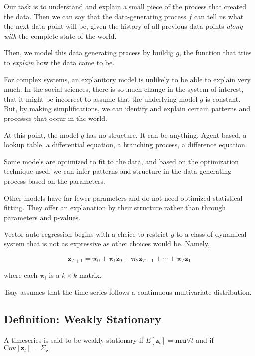 \documentclass{article}
\begin{document}
        Our task is to understand and explain a small piece of
        the process that created the data. Then we can say that
        the data-generating process $f$ can tell us what the next
        data point will be, given the history of all previous data
        points \textit{along with} the complete state of 
        the world.
    
        Then, we model this data generating process by buildig $g$,
        the function that tries to \textit{explain} how the data
        came to be.
    
        For complex systems, an explanitory model is unlikely to
        be able to explain very much. In the social sciences,
        there is so much change in the system of interest, that it might
        be incorrect to assume that the underlying model $g$ is constant.
        But, by making simplifications, we can identify and explain
        certain patterns and processes that occur in the world.
    
        At this point, the model $g$ has no structure. It can be anything.
        Agent based, a lookup table, a differential equation, a
        branching process, a difference equation.
    
        Some models are optimized to fit to the data, and based on 
        the optimization technique used, we can infer patterns and 
        structure in the data generating process based on the parameters.
        
        Other models have far fewer parameters and do not need optimized
        statistical fitting. They offer an explanation by their structure
        rather than through parameters and p-values.
    
        Vector auto regression begins with a choice to restrict $g$
        to a class of dynamical system that is not as expressive as 
        other choices would be.
        Namely,
    
        \begin{equation}
            \dot{\bm{z}}_{T+1} = \bm{\pi}_0 
                + \bm{\pi}_1\bm{z}_T 
                + \bm{\pi}_2\bm{z}_{T-1} 
                + \cdots 
                + \bm{\pi}_T\bm{z}_1
        \end{equation}

        where each $\bm{\pi}_i$ is a $k \times k$ matrix.

        Tsay assumes that the time series follows
        a contimuous multivariate distribution. 

        \subsection{Definition: Weakly Stationary}
            A timeseries is said to be weakly stationary if $E[\bm{z}_t]
            = \bm{mu} \forall t$ and if $\text{Cov}[\bm{z}_t] = \Sigma_{\bm{z}}$
        
\end{document}
